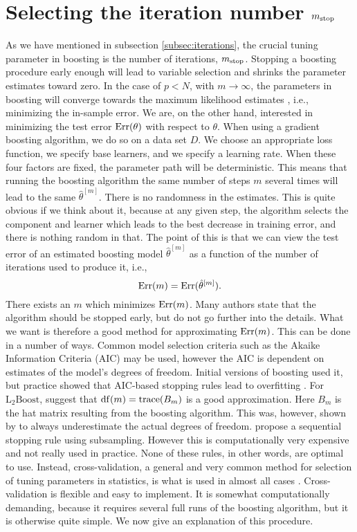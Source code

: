 
\section{Selecting the iteration number $m_{\text{stop}}$}
\label{sec:stop}
As we have mentioned in subsection \ref{subsec:iterations}, the crucial tuning parameter in boosting is the number of iterations, $m_{\text{stop}}$. 
Stopping a boosting procedure early enough will lead to variable selection and shrinks the parameter estimates toward zero.
In the case of $p<N$, with $m\to\infty$, the parameters in boosting will converge towards the maximum likelihood estimates \citep{DeBin2016}, i.e., minimizing the in-sample error.
We are, on the other hand, interested in minimizing the test error $\text{Err}(\theta)$ with respect to $\theta$.
When using a gradient boosting algorithm, we do so on a data set $D$.
We choose an appropriate loss function, we specify base learners, and we specify a learning rate.
When these four factors are fixed, the parameter path will be deterministic.
This means that running the boosting algorithm the same number of steps $m$ several times will lead to the same $\hat{\theta}^{[m]}$.
There is no randomness in the estimates.
This is quite obvious if we think about it, because at any given step, the algorithm selects the component and learner which leads to the best decrease in training error, and there is nothing random in that.
The point of this is that we can view the test error of an estimated boosting model $\hat{\theta}^{[m]}$ as a function of the number of iterations used to produce it, i.e.,
\begin{equation}\label{test-error-m}
    \text{Err}(m)=\text{Err}(\hat{\theta}^{[m]}).
\end{equation}
There exists an $m$ which minimizes $\text{Err}(m)$.
Many authors state that the algorithm should be stopped early, but do not go further into the details.
What we want is therefore a good method for approximating $\text{Err}(m)$.
This can be done in a number of ways.
Common model selection criteria such as the Akaike Information Criteria (AIC) may be used, however the AIC is dependent on estimates of the model's degrees of freedom. 
Initial versions of boosting used it, but practice showed that AIC-based stopping rules lead to overfitting \citep{mayr-hofner}.
For $\text{L}_2\text{Boost}$, \citet{buhlmann2007} suggest that $\operatorname{df}(m)=\operatorname{trace}(B_m)$ is a good approximation.
Here $B_m$ is the hat matrix resulting from the boosting algorithm.
This was, however, shown by \citet{hastie2007} to always underestimate the actual degrees of freedom.
\citet{mayr-hofner} propose a sequential stopping rule using subsampling.
However this is computationally very expensive and not really used in practice.
None of these rules, in other words, are optimal to use.
Instead, cross-validation, a general and very common method for selection of tuning parameters in statistics, is what is used in almost all cases \citep{mayr14a,mayr14b,mayr17}.
Cross-validation is flexible and easy to implement.
It is somewhat computationally demanding, because it requires several full runs of the boosting algorithm, but it is otherwise quite simple.
We now give an explanation of this procedure.


